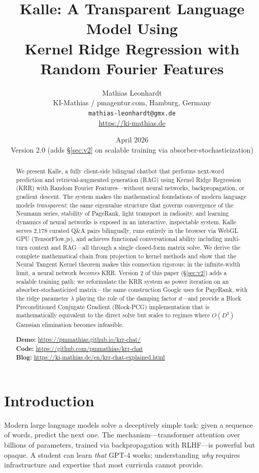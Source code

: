 \documentclass[11pt,a4paper]{article}
\title{Kalle: A Transparent Language Model Using\\Kernel Ridge Regression with Random Fourier Features}
\author{Mathias Leonhardt\\
  KI-Mathias / pmagentur.com, Hamburg, Germany\\
  \texttt{mathias-leonhardt@gmx.de}\\[0.5em]
  \url{https://ki-mathias.de}
}
\date{April 2026 \\ \small Version 2.0 (adds \S\ref{sec:v2} on scalable training via absorber-stochasticization)}
\begin{document}
\maketitle

\begin{abstract}
We present Kalle, a fully client-side bilingual chatbot that performs next-word prediction and retrieval-augmented generation (RAG) using Kernel Ridge Regression (KRR) with Random Fourier Features---without neural networks, backpropagation, or gradient descent. The system makes the mathematical foundations of modern language models \emph{transparent}: the same eigenvalue structure that governs convergence of the Neumann series, stability of PageRank, light transport in radiosity, and learning dynamics of neural networks is exposed in an interactive, inspectable system. Kalle serves 2,178 curated Q\&A pairs bilingually, runs entirely in the browser via WebGL GPU (TensorFlow.js), and achieves functional conversational ability including multi-turn context and RAG---all through a single closed-form matrix solve. We derive the complete mathematical chain from projection to kernel methods and show that the Neural Tangent Kernel theorem \citep{jacot2018ntk} makes this connection rigorous: in the infinite-width limit, a neural network \emph{becomes} KRR. Version 2 of this paper (\S\ref{sec:v2}) adds a scalable training path: we reformulate the KRR system as power iteration on an absorber-stochasticized matrix---the same construction Google uses for PageRank, with the ridge parameter $\lambda$ playing the role of the damping factor $d$---and provide a Block Preconditioned Conjugate Gradient (Block-PCG) implementation that is mathematically equivalent to the direct solve but scales to regimes where $O(D^3)$ Gaussian elimination becomes infeasible.

\medskip
\noindent\textbf{Demo:} \url{https://pmmathias.github.io/krr-chat/}\\
\textbf{Code:} \url{https://github.com/pmmathias/krr-chat}\\
\textbf{Blog:} \url{https://ki-mathias.de/en/krr-chat-explained.html}
\end{abstract}

\section{Introduction}

Modern large language models solve a deceptively simple task: given a sequence of words, predict the next one. The mechanism---transformer attention over billions of parameters, trained via backpropagation with RLHF---is powerful but opaque. A student can learn \emph{that} GPT-4 works; understanding \emph{why} requires infrastructure and expertise that most curricula cannot provide.
\end{document}
